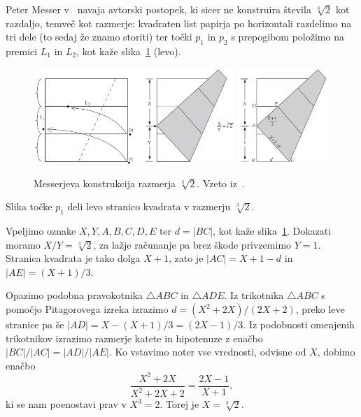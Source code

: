 Peter Messer v~\cite{messer1986} navaja avtorski postopek, ki sicer ne konstruira števila $\sqrt[3]{2}$ kot razdaljo, temveč kot razmerje: kvadraten list papirja po horizontali razdelimo na tri dele (to sedaj že znamo storiti) ter točki $p_1$ in $p_2$ s prepogibom položimo na premici $L_1$ in $L_2$, kot kaže slika~\ref{fig:messer} (levo).
\begin{figure}[h]
    \centering
    \includegraphics[width=0.68\textwidth]{images/starogr_problemi/messer1.png}
    \includegraphics[width=0.3\textwidth]{images/starogr_problemi/messer2.png}
    \caption[Messerjeva konstrukcija]{Messerjeva konstrukcija razmerja $\sqrt[3]{2}$. Vzeto iz~\cite[str.\ 67--68]{hull2013}.}
    \label{fig:messer}
\end{figure}
\begin{trditev}
    Slika točke $p_1$ deli levo stranico kvadrata v razmerju $\sqrt[3]{2}$.
\end{trditev}
\begin{dokaz}
    Vpeljimo oznake $X, Y, A, B, C, D, E$ ter $d = |BC|$, kot kaže slika~\ref{fig:messer}. Dokazati moramo $X/Y = \sqrt[3]{2}$, za lažje računanje pa brez škode privzemimo $Y=1$. Stranica kvadrata je tako dolga $X+1$, zato je $|AC| = X+1-d$ in $|AE| = (X+1)/3$.

    Opazimo podobna pravokotnika $\triangle ABC$ in $\triangle ADE$. Iz trikotnika $\triangle ABC$ s pomočjo Pitagorovega izreka izrazimo $d = (X^2+2X)/(2X+2)$, preko leve stranice pa še $|AD| = X - (X+1)/3 = (2X-1)/3$. Iz podobnosti omenjenih trikotnikov izrazimo razmerje katete in hipotenuze z enačbo $|BC|/|AC| = |AD|/|AE|$. Ko vstavimo noter vse vrednosti, odvisne od $X$, dobimo enačbo
    $$ \frac{X^2 + 2X}{X^2 + 2X + 2} = \frac{2X - 1}{X + 1},$$
    ki se nam poenostavi prav v $X^3 = 2$. Torej je $X = \sqrt[3]{2}$.
\end{dokaz}

